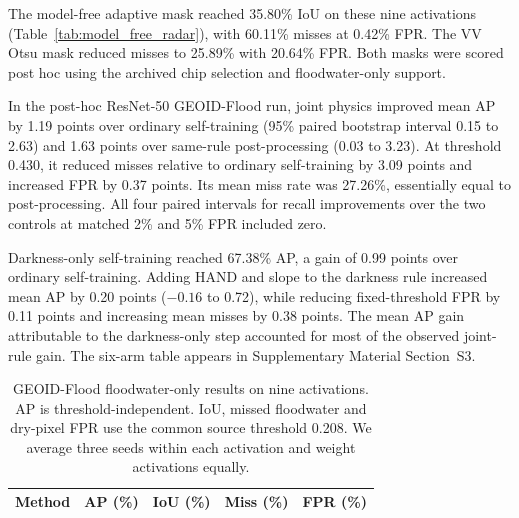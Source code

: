 The model-free adaptive mask reached 35.80\% IoU on these nine activations (Table~\ref{tab:model_free_radar}), with 60.11\% misses at 0.42\% FPR. The VV Otsu mask reduced misses to 25.89\% with 20.64\% FPR. Both masks were scored post hoc using the archived chip selection and floodwater-only support.

In the post-hoc ResNet-50 GEOID-Flood run, joint physics improved mean AP by 1.19 points over ordinary self-training (95\% paired bootstrap interval 0.15 to 2.63) and 1.63 points over same-rule post-processing (0.03 to 3.23). At threshold 0.430, it reduced misses relative to ordinary self-training by 3.09 points and increased FPR by 0.37 points. Its mean miss rate was 27.26\%, essentially equal to post-processing. All four paired intervals for recall improvements over the two controls at matched 2\% and 5\% FPR included zero.

Darkness-only self-training reached 67.38\% AP, a gain of 0.99 points over ordinary self-training. Adding HAND and slope to the darkness rule increased mean AP by 0.20 points ($-0.16$ to 0.72), while reducing fixed-threshold FPR by 0.11 points and increasing mean misses by 0.38 points. The mean AP gain attributable to the darkness-only step accounted for most of the observed joint-rule gain. The six-arm table appears in Supplementary Material Section~S3.

\begin{table}[pos=t]
\caption{GEOID-Flood floodwater-only results on nine activations. AP is threshold-independent. IoU, missed floodwater and dry-pixel FPR use the common source threshold 0.208. We average three seeds within each activation and weight activations equally.}
\label{tab:geoid_ext}
\centering
\begin{tabular}{@{}lrrrr@{}}
\toprule
Method & AP (\%) & IoU (\%) & Miss (\%) & FPR (\%) \\
\midrule

\end{tabular}
\end{table}

